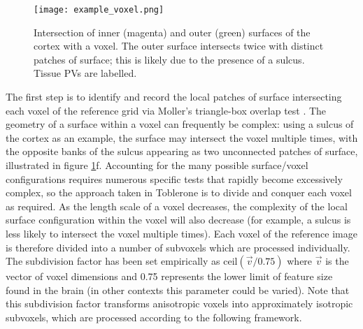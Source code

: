 \begin{figure}
\centering
\texttt{[image: example\_voxel.png]}
\caption{Intersection of inner (magenta) and outer (green) surfaces of the cortex with a voxel. The outer surface intersects twice with distinct patches of surface; this is likely due to the presence of a sulcus. Tissue PVs are labelled.  }
\label{example_voxel}
\end{figure}

The first step is to identify and record the local patches of surface intersecting each voxel of the reference grid via Moller’s triangle-box overlap test \cite{Akenine-Moller2001}. The geometry of a surface within a voxel can frequently be complex: using a sulcus of the cortex as an example, the surface may intersect the voxel multiple times, with the opposite banks of the sulcus appearing as two unconnected patches of surface, illustrated in figure \ref{example_voxel}f. Accounting for the many possible surface/voxel configurations requires numerous specific tests that rapidly become excessively complex, so the approach taken in Toblerone is to divide and conquer each voxel as required. As the length scale of a voxel decreases, the complexity of the local surface configuration within the voxel will also decrease (for example, a sulcus is less likely to intersect the voxel multiple times). Each voxel of the reference image is therefore divided into a number of subvoxels which are processed individually. The subdivision factor has been set empirically as $\mathrm{ceil}(\vec{v} / 0.75)$ where $\vec{v}$ is the vector of voxel dimensions and 0.75 represents the lower limit of feature size found in the brain (in other contexts this parameter could be varied). Note that this subdivision factor transforms anisotropic voxels into approximately isotropic subvoxels,  which are processed according to the following framework. 


